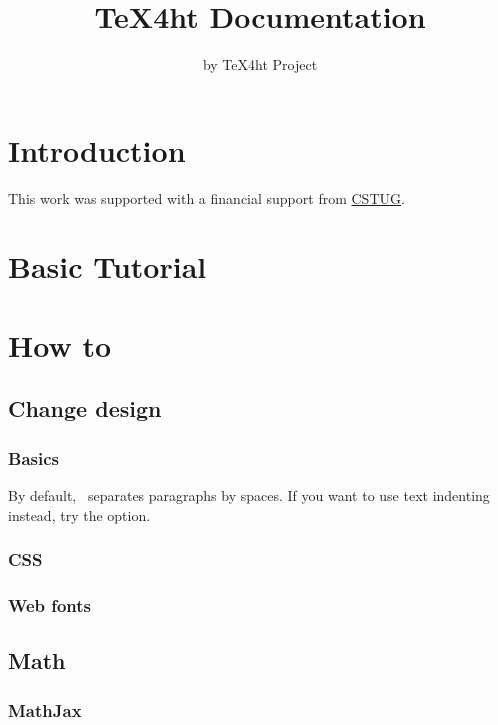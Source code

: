 \documentclass{book}
\title{TeX4ht Documentation}
\author{by TeX4ht Project}
\begin{document}
\maketitle

\ifdefined\HCode\else\tableofcontents\fi


\chapter{Introduction}


\begin{acknowledgements}
This work was supported with a financial support from \href{https://cstug.cz/}{CSTUG}.
\end{acknowledgements}

\chapter{Basic Tutorial}
\chapter{How to}

\section{Change design}
\subsection{Basics}

By default, \texfourht\ separates paragraphs by spaces. If you want to use text indenting instead, try the  option.

\subsection{CSS}
\subsection{Web fonts}

\section{Math}

\subsection{MathJax}
\end{document}
